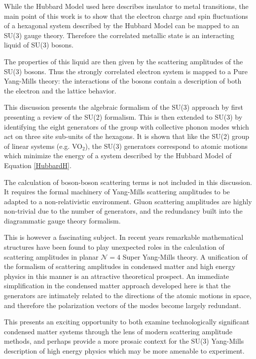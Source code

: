 \documentclass[prb,showpacs,superscriptaddress,titlepage,amsmath,amssymb,twocolumn]{revtex4-1}
\begin{document}
While the Hubbard Model used here describes insulator to metal transitions, the main point of this work is to show that the electron charge and spin fluctuations of a hexagonal system described by the Hubbard Model can be mapped to an SU(3) gauge theory. Therefore the correlated metallic state is an interacting liquid of SU(3) bosons. 

The properties of this liquid are then given by the scattering amplitudes of the SU(3) bosons. Thus the strongly correlated electron system is mapped to a Pure Yang-Mills theory: the interactions of the bosons contain a description of both the electron and the lattice behavior.

This discussion presents the algebraic formalism of the SU(3) approach by first presenting a review of the SU(2) formalism\cite{Booth2020,Booth_Wilson_2020}. This is then extended to SU(3) by identifying the eight generators of the group with collective phonon modes which act on three site sub-units of the hexagons. It is shown that like the SU(2) group of linear systems (e.g. VO$_{2}$), the SU(3) generators correspond to atomic motions which minimize the energy of a system described by the Hubbard Model of Equation \ref{HubbardH}.

The calculation of boson-boson scattering terms is not included in this discussion. It requires the formal machinery of Yang-Mills scattering amplitudes to be adapted to a non-relativistic environment. Gluon scattering amplitudes are highly non-trivial due to the number of generators, and the redundancy built into the diagrammatic gauge theory formalism.\cite{Dixon2013a,Arkani-Hamed2017} 

This is however a fascinating subject. In recent years remarkable mathematical structures have been found to play unexpected roles in the calculation of scattering amplitudes in planar $\mathcal{N}=4$ Super Yang-Mills theory\cite{Arkani-Hamed2012,Arkani-Hamed2013}. A unification of the formalism of scattering amplitudes in condensed matter and high energy physics in this manner is an attractive theoretical prospect. An immediate simplification in the condensed matter approach developed here is that the generators are intimately related to the directions of the atomic motions in space, and therefore the polarization vectors of the modes become largely redundant.

This presents an exciting opportunity to both examine technologically significant condensed matter systems through the lens of modern scattering amplitude methods, and perhaps provide a more prosaic context for the SU(3) Yang-Mills description of high energy physics which may be more amenable to experiment.
\end{document}
